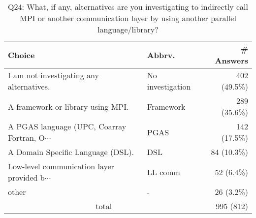 \begin{table}[htb]%
\begin{center}%
\caption{Q24: What, if any, alternatives are you investigating to indirectly call MPI or another communication layer by using another parallel language/library?}%
\label{tab:Q24-ans}%
\begin{tabular}{l|l|r}%
\hline%
Choice & Abbrv. & \# Answers \\%
\hline%
I am not investigating any alternatives. & No investigation & 402 (49.5\%) \\%
A framework or library using MPI. & Framework & 289 (35.6\%) \\%
{\small A PGAS language (UPC, Coarray Fortran, O$\cdots$} & PGAS & 142 (17.5\%) \\%
A Domain Specific Language (DSL). & DSL & 84 (10.3\%) \\%
{\small Low-level communication layer provided b$\cdots$} & LL comm & 52 (6.4\%) \\%
other & - & 26 (3.2\%) \\%
\hline%
\multicolumn{2}{c}{total} & 995 (812)\\%
\hline%
\end{tabular}%
\end{center}%
\end{table}%
